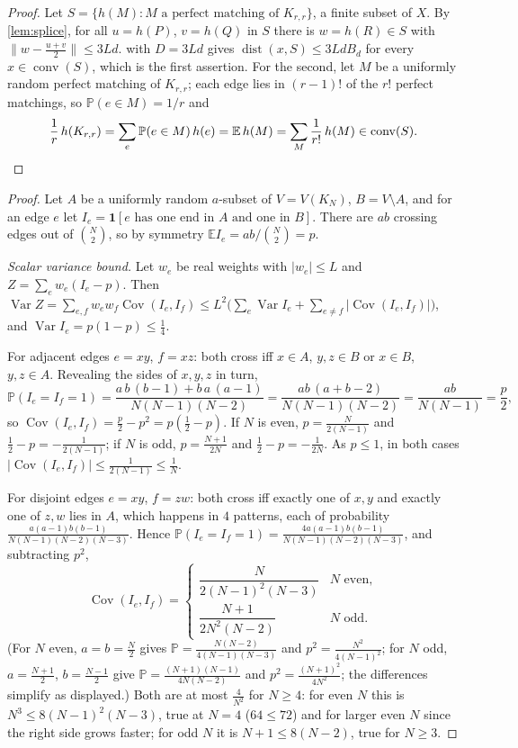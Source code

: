 \documentclass[11pt,a4paper]{article}
\theoremstyle{plain}
\theoremstyle{definition}
\theoremstyle{remark}
\newcommand{\E}{\mathbb E}
\newcommand{\Prob}{\mathbb P}
\newcommand{\Cov}{\operatorname{Cov}}
\newcommand{\Var}{\operatorname{Var}}
\newcommand{\conv}{\operatorname{conv}}
\newcommand{\dist}{\operatorname{dist}}
\newcommand{\vone}{\mathbf 1}
\begin{document}
\label{pf:match}
\propmatch*
\begin{proof}
Let $S=\{h(M):M\text{ a perfect matching of }K_{r,r}\}$, a finite subset of $X$. By \cref{lem:splice}, for all $u=h(P)$, $v=h(Q)$ in $S$ there is $w=h(R)\in S$ with $\|w-\frac{u+v}2\|\le3Ld$.  with $D=3Ld$ gives $\dist(x,S)\le3LdB_d$ for every $x\in\conv(S)$, which is the first assertion. For the second, let $M$ be a uniformly random perfect matching of $K_{r,r}$; each edge lies in $(r-1)!$ of the $r!$ perfect matchings, so $\Prob(e\in M)=1/r$ and
\[
 \frac1r\,h(K_{r,r})=\sum_e\Prob(e\in M)\,h(e)=\E\,h(M)=\sum_{M}\frac1{r!}\,h(M)\in\conv(S). \qedhere
\]
\end{proof}

\label{pf:cut}
\lemcut*
\begin{proof}
Let $A$ be a uniformly random $a$-subset of $V=V(K_N)$, $B=V\setminus A$, and for an edge $e$ let $I_e=\vone[e\text{ has one end in }A\text{ and one in }B]$. There are $ab$ crossing edges out of $\binom N2$, so by symmetry $\E I_e=ab/\binom N2=p$.

\emph{Scalar variance bound.} Let $w_e$ be real weights with $|w_e|\le L$ and $Z=\sum_ew_e(I_e-p)$. Then $\Var Z=\sum_{e,f}w_ew_f\Cov(I_e,I_f)\le L^2\bigl(\sum_e\Var I_e+\sum_{e\ne f}|\Cov(I_e,I_f)|\bigr)$, and $\Var I_e=p(1-p)\le\frac14$.

For adjacent edges $e=xy$, $f=xz$: both cross iff $x\in A$, $y,z\in B$ or $x\in B$, $y,z\in A$. Revealing the sides of $x,y,z$ in turn,
\[
 \Prob(I_e=I_f=1)=\frac{a\,b\,(b-1)+b\,a\,(a-1)}{N(N-1)(N-2)}=\frac{ab\,(a+b-2)}{N(N-1)(N-2)}=\frac{ab}{N(N-1)}=\frac p2 ,
\]
so $\Cov(I_e,I_f)=\frac p2-p^2=p(\frac12-p)$. If $N$ is even, $p=\frac{N}{2(N-1)}$ and $\frac12-p=-\frac1{2(N-1)}$; if $N$ is odd, $p=\frac{N+1}{2N}$ and $\frac12-p=-\frac1{2N}$. As $p\le1$, in both cases $|\Cov(I_e,I_f)|\le\frac1{2(N-1)}\le\frac1N$.

For disjoint edges $e=xy$, $f=zw$: both cross iff exactly one of $x,y$ and exactly one of $z,w$ lies in $A$, which happens in $4$ patterns, each of probability $\frac{a(a-1)b(b-1)}{N(N-1)(N-2)(N-3)}$. Hence $\Prob(I_e=I_f=1)=\frac{4a(a-1)b(b-1)}{N(N-1)(N-2)(N-3)}$, and subtracting $p^2$,
\[
 \Cov(I_e,I_f)=\begin{cases}\dfrac{N}{2(N-1)^2(N-3)}&N\text{ even},\\[8pt]\dfrac{N+1}{2N^2(N-2)}&N\text{ odd}.\end{cases}
\]
(For $N$ even, $a=b=\frac N2$ gives $\Prob=\frac{N(N-2)}{4(N-1)(N-3)}$ and $p^2=\frac{N^2}{4(N-1)^2}$; for $N$ odd, $a=\frac{N+1}2$, $b=\frac{N-1}2$ give $\Prob=\frac{(N+1)(N-1)}{4N(N-2)}$ and $p^2=\frac{(N+1)^2}{4N^2}$; the differences simplify as displayed.) Both are at most $\frac4{N^2}$ for $N\ge4$: for even $N$ this is $N^3\le8(N-1)^2(N-3)$, true at $N=4$ ($64\le72$) and for larger even $N$ since the right side grows faster; for odd $N$ it is $N+1\le8(N-2)$, true for $N\ge3$.


\end{proof}
\end{document}

